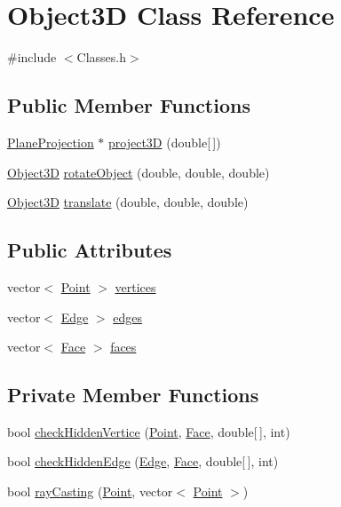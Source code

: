 \hypertarget{class_object3_d}{}\section{Object3D Class Reference}
\label{class_object3_d}


{\ttfamily \#include $<$Classes.\+h$>$}

\subsection*{Public Member Functions}
\begin{DoxyCompactItemize}
\item 
\hyperlink{class_plane_projection}{Plane\+Projection} $\ast$ \hyperlink{class_object3_d_a7767ac8b73a117c8cd8cbdaf7c6f4699}{project3D} (double\mbox{[}$\,$\mbox{]})
\item 
\hyperlink{class_object3_d}{Object3D} \hyperlink{class_object3_d_a476b3de610cb30be0b050b4701ba4701}{rotate\+Object} (double, double, double)
\item 
\hyperlink{class_object3_d}{Object3D} \hyperlink{class_object3_d_afb299c53794e9f4fb708efbde24c9a21}{translate} (double, double, double)
\end{DoxyCompactItemize}
\subsection*{Public Attributes}
\begin{DoxyCompactItemize}
\item 
vector$<$ \hyperlink{class_point}{Point} $>$ \hyperlink{class_object3_d_a225a5c970a1d3d343fc495764ccc3cfd}{vertices}
\item 
vector$<$ \hyperlink{class_edge}{Edge} $>$ \hyperlink{class_object3_d_ad1d85cb131bbc39c772dc5badd0ec1c0}{edges}
\item 
vector$<$ \hyperlink{class_face}{Face} $>$ \hyperlink{class_object3_d_a58677f390d3ba13026e68f4b2a530580}{faces}
\end{DoxyCompactItemize}
\subsection*{Private Member Functions}
\begin{DoxyCompactItemize}
\item 
bool \hyperlink{class_object3_d_a2ec1e4c1198f44794b3c3a1c72f6143d}{check\+Hidden\+Vertice} (\hyperlink{class_point}{Point}, \hyperlink{class_face}{Face}, double\mbox{[}$\,$\mbox{]}, int)
\item 
bool \hyperlink{class_object3_d_a2bc5ce361addc05302a078ada575261d}{check\+Hidden\+Edge} (\hyperlink{class_edge}{Edge}, \hyperlink{class_face}{Face}, double\mbox{[}$\,$\mbox{]}, int)
\item 
bool \hyperlink{class_object3_d_a026c35f9fcf1f58f4d48c18ab26d7712}{ray\+Casting} (\hyperlink{class_point}{Point}, vector$<$ \hyperlink{class_point}{Point} $>$)
\end{DoxyCompactItemize}
